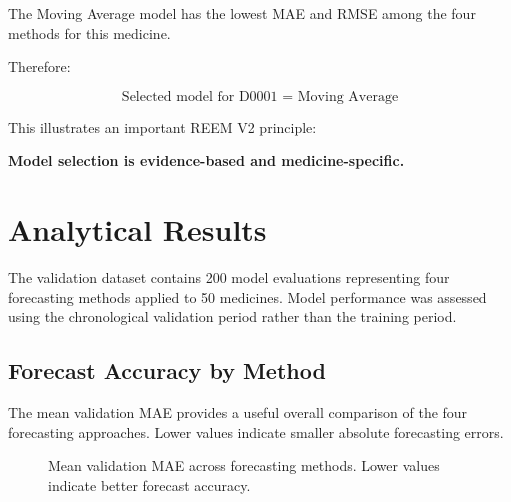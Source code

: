\documentclass[11pt,a4paper]{article}
\begin{document}
The Moving Average model has the lowest MAE and RMSE among the four
methods for this medicine.

Therefore:

\[
\boxed{
\text{Selected model for D0001 = Moving Average}
}
\]

This illustrates an important REEM V2 principle:

\begin{center}
\textbf{Model selection is evidence-based and medicine-specific.}
\end{center}


\section{Analytical Results}

The validation dataset contains 200 model evaluations representing four
forecasting methods applied to 50 medicines. Model performance was assessed
using the chronological validation period rather than the training period.

\subsection{Forecast Accuracy by Method}

The mean validation MAE provides a useful overall comparison of the four
forecasting approaches. Lower values indicate smaller absolute forecasting
errors.

\begin{figure}[H]
\centering
{}
\caption{Mean validation MAE across forecasting methods. Lower values indicate better forecast accuracy.}
\label{fig:method-mae}
\end{figure}
\end{document}
